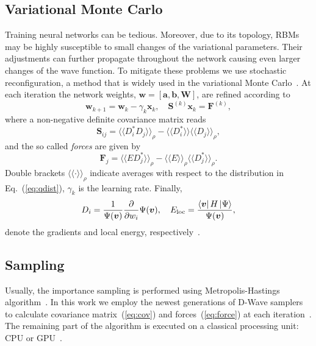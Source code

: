 \documentclass[aps,pra,showpacs,amsmath,amssymb,amsfonts,superscriptaddress,lengthcheck,longbibliography, twocolumn]{revtex4-1}
\newcommand{\bra}[1]{\left\langle #1\right|}
\newcommand{\ket}[1]{\left|#1\right\rangle}
\newcommand{\bfm}{\boldsymbol}
\begin{document}
\subsection{Variational Monte Carlo} 
% 
Training neural networks can be tedious. Moreover, due to its topology, RBMs may be highly susceptible to small changes of the variational parameters. Their adjustments can further propagate throughout the network causing even larger changes of the wave function. To mitigate these problems we use stochastic reconfiguration, a method that is widely used in the variational Monte Carlo~\cite{Sorella98}. At each iteration the network weights, $\bfm w = [\bfm a,\bfm b,\bfm W]$, 
are refined according to
%
\begin{equation} 
\label{eq:update}
\bfm w_{k+1} = \bfm w_{k} - \gamma_k \bfm x_k, \quad \bfm{S}^{(k)} \bfm x_k =  \bfm{F}^{(k)},
\end{equation}
%
where a non-negative definite covariance matrix reads 
%
\begin{equation} 
\label{eq:cov}
 \bfm{S}_{ij} = \langle\langle D_i^* D_j \rangle \rangle_{\rho} - 
                      \langle\langle D_i^*  \rangle\rangle \langle\langle D_j  \rangle\rangle_{\rho},
\end{equation}
and the so called \emph{forces} are given by
 \begin{equation} 
 \label{eq:force}
 \bfm{F}_j = \langle\langle E D_j^* \rangle \rangle_{\rho} - 
                    \langle\langle E  \rangle\rangle_{\rho} \langle\langle D_j^*  \rangle\rangle_{\rho}.
 \end{equation}
% 
Double brackets $\langle\langle\cdot\rangle \rangle_{\rho}$ indicate averages with respect to the distribution in Eq.~(\ref{eq:qdist}), $\gamma_k$ is the learning rate. Finally, 
%
\begin{equation} 
\label{eq:deriv}
D_i = \frac{1}{\Psi(\bfm v)} \frac{\partial}{\partial w_i} \Psi(\bfm v), \quad 
%
  E_{\rm loc} = \frac{\bra{\bfm v} H \ket{\Psi}}{\Psi(\bfm v)},
\end{equation} 
%
denote the gradients and local energy, respectively~\cite{Carleo17}. 
%
\subsection{Sampling} 
%
Usually, the importance sampling is performed using Metropolis-Hastings algorithm~\cite{Calderhead14}. In this work we employ the newest generations of D-Wave samplers to calculate covariance matrix~(\ref{eq:cov}) and forces~(\ref{eq:force}) at each iteration~\cite{Amin16}. The remaining part of the algorithm is executed on a classical processing unit: CPU or GPU~\cite{GPU2018}. 
\end{document}
